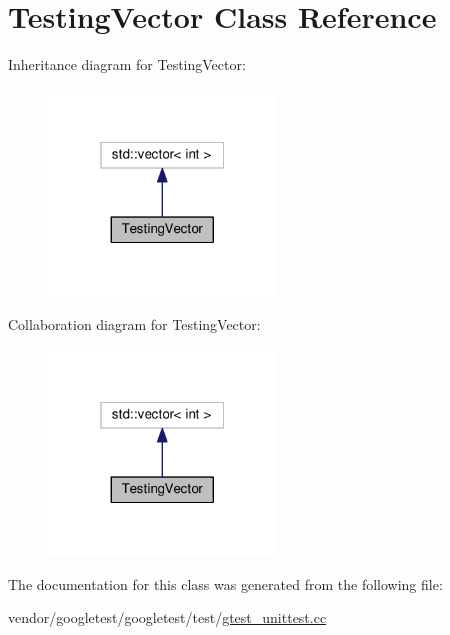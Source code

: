 \hypertarget{classTestingVector}{}\section{Testing\+Vector Class Reference}
\label{classTestingVector}


Inheritance diagram for Testing\+Vector\+:\nopagebreak
\begin{figure}[H]
\begin{center}
\leavevmode
\includegraphics[width=172pt]{classTestingVector__inherit__graph}
\end{center}
\end{figure}


Collaboration diagram for Testing\+Vector\+:\nopagebreak
\begin{figure}[H]
\begin{center}
\leavevmode
\includegraphics[width=172pt]{classTestingVector__coll__graph}
\end{center}
\end{figure}


The documentation for this class was generated from the following file\+:\begin{DoxyCompactItemize}
\item 
vendor/googletest/googletest/test/\hyperlink{gtest__unittest_8cc}{gtest\+\_\+unittest.\+cc}\end{DoxyCompactItemize}
